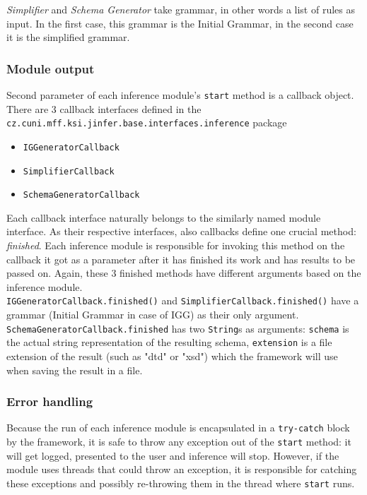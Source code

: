 \documentclass[a4paper,10pt,oneside]{article}
\newcommand{\code}[1]{\texttt{#1}}
\begin{document}
\emph{Simplifier} and \emph{Schema Generator} take grammar, %
in other words a list of rules as input. In the first case, this grammar is the Initial Grammar, in the second case it is the simplified grammar.

\subsubsection{Module output}
Second parameter of each inference module's \code{start} method is a callback object. There are 3 callback interfaces defined in the \code{cz.cuni.mff.ksi.jinfer.base.interfaces.inference} package

\begin{itemize}
	\item \code{IGGeneratorCallback}
	\item \code{SimplifierCallback}
	\item \code{SchemaGeneratorCallback}
\end{itemize}

Each callback interface naturally belongs to the similarly named module interface. As their respective interfaces, also callbacks define one crucial method: \emph{finished}. Each inference module is responsible for invoking this method on the callback it got as a parameter after it has finished its work and has results to be passed on. Again, these 3 finished methods have different arguments based on the inference module.\\

\code{IGGeneratorCallback.finished()} and \code{SimplifierCallback.finished()} have a grammar (Initial Grammar in case of IGG) as their only argument.\\

\code{SchemaGeneratorCallback.finished} has two \code{String}s as arguments: \code{schema} is the actual string representation of the resulting schema, \code{extension} is a file extension of the result (such as "dtd" or "xsd") which the framework will use when saving the result in a file.

\subsubsection{Error handling}

Because the run of each inference module is encapsulated in a \code{try-catch} block by the framework, it is safe to throw any exception out of the \code{start} method: it will get logged, presented to the user and inference will stop. However, if the module uses threads that could throw an exception, it is responsible for catching these exceptions and possibly re-throwing them in the thread where \code{start} runs.
\end{document}
